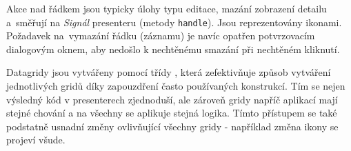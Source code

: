 Akce nad řádkem jsou typicky úlohy typu editace, mazání zobrazení detailu a~směřují na \textit{Signál} presenteru (metody \texttt{handle}). Jsou reprezentovány ikonami. Požadavek na~vymazání řádku (záznamu) je navíc opatřen potvrzovacím dialogovým oknem, aby nedošlo k nechtěnému smazání při nechtěném kliknutí.

Datagridy jsou vytvářeny pomocí třídy , která zefektivňuje způsob vytváření jednotlivých gridů díky zapouzdření často používaných konstrukcí. Tím se nejen výsledný kód v presenterech zjednoduší, ale zároveň gridy napříč aplikací mají stejné chování a na všechny se aplikuje stejná logika. Tímto přístupem se také podstatně usnadní změny ovlivňující všechny gridy - například změna ikony se projeví všude.